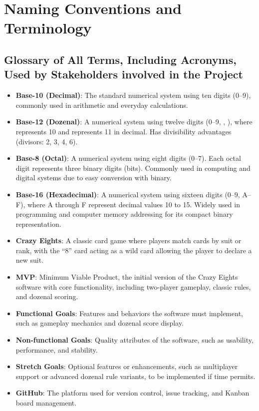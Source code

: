 \documentclass[12pt]{article}
\begin{document}
\section{Naming Conventions and Terminology}
\subsection{Glossary of All Terms, Including Acronyms, Used by Stakeholders
involved in the Project}

\begin{itemize}
    \item \textbf{Base-10 (Decimal)}: The standard numerical system using ten digits (0--9), commonly used in arithmetic and everyday calculations.
    \item \textbf{Base-12 (Dozenal)}: A numerical system using twelve digits (0--9, , ), where  represents 10 and  represents 11 in decimal. Has divisibility advantages (divisors: 2, 3, 4, 6).
    \item \textbf{Base-8 (Octal)}: A numerical system using eight digits (0--7). Each octal digit represents three binary digits (bits). Commonly used in computing and digital systems due to easy conversion with binary.
    \item \textbf{Base-16 (Hexadecimal)}: A numerical system using sixteen digits (0--9, A--F), where A through F represent decimal values 10 to 15. Widely used in programming and computer memory addressing for its compact binary representation.
    \item \textbf{Crazy Eights}: A classic card game where players match cards by suit or rank, with the ``8'' card acting as a wild card allowing the player to declare a new suit.
    \item \textbf{MVP}: Minimum Viable Product, the initial version of the Crazy Eights software with core functionality, including two-player gameplay, classic rules, and dozenal scoring.
    \item \textbf{Functional Goals}: Features and behaviors the software must implement, such as gameplay mechanics and dozenal score display.
    \item \textbf{Non-functional Goals}: Quality attributes of the software, such as usability, performance, and stability.
    \item \textbf{Stretch Goals}: Optional features or enhancements, such as multiplayer support or advanced dozenal rule variants, to be implemented if time permits.
    \item \textbf{GitHub}: The platform used for version control, issue tracking, and Kanban board management.

\end{itemize}
\end{document}

